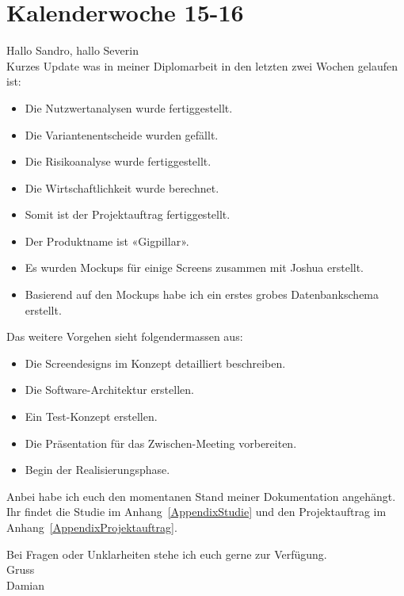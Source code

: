 \section{Kalenderwoche 15-16}

Hallo Sandro, hallo Severin\\

\noindent
Kurzes Update was in meiner Diplomarbeit in den letzten zwei Wochen
gelaufen ist:

\begin{itemize}
  \tightlist{}
  \item{}
    Die Nutzwertanalysen wurde fertiggestellt.
  \item{}
    Die Variantenentscheide wurden gefällt.
  \item{}
    Die Risikoanalyse wurde fertiggestellt.
  \item{}
    Die Wirtschaftlichkeit wurde berechnet.
  \item{}
    Somit ist der Projektauftrag fertiggestellt.
  \item{}
    Der Produktname ist «Gigpillar».
  \item{}
    Es wurden Mockups für einige Screens zusammen mit Joshua erstellt.
  \item{}
    Basierend auf den Mockups habe ich ein erstes grobes Datenbankschema
    erstellt.
\end{itemize}

\noindent
Das weitere Vorgehen sieht folgendermassen aus:

\begin{itemize}
  \tightlist{}
  \item{}
    Die Screendesigns im Konzept detailliert beschreiben.
  \item{}
    Die Software-Architektur erstellen.
  \item{}
    Ein Test-Konzept erstellen.
  \item{}
    Die Präsentation für das Zwischen-Meeting vorbereiten.
  \item{}
    Begin der Realisierungsphase.
\end{itemize}

\noindent
Anbei habe ich euch den momentanen Stand meiner Dokumentation angehängt.
Ihr findet die Studie im Anhang~\ref{AppendixStudie} und den Projektauftrag
im Anhang~\ref{AppendixProjektauftrag}.

\noindent
Bei Fragen oder Unklarheiten stehe ich euch gerne zur Verfügung.\\

\noindent
Gruss\\
Damian
